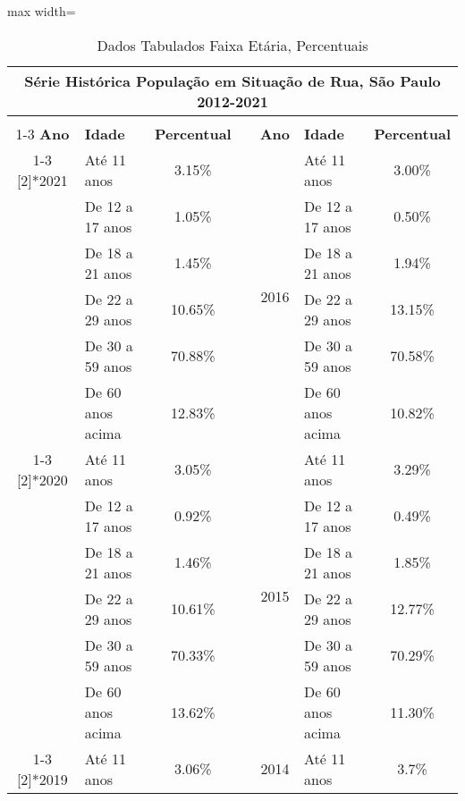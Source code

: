 \documentclass[14pt]{extarticle}
\begin{document}
\begin{table}[htbp]
  \centering
  \caption{Dados Tabulados Faixa Etária, Percentuais}
   \tabcolsep=0.15cm
	\renewcommand{\arraystretch}{1.0}
	\begin{adjustbox}{max width=\linewidth}
    \begin{tabular}{clcrclc}
    \toprule
    \multicolumn{7}{c}{Série Histórica População em Situação de Rua, São Paulo 2012-2021} \\
    \midrule
         &      &      &      &      &      &  \\
\cmidrule{1-3}\cmidrule{5-7}    \rowcolor[rgb]{ .906,  .902,  .902} \textbf{Ano} & \textbf{Idade} & \textbf{Percentual} & \cellcolor[rgb]{ .906,  .902,  .902} & \textbf{Ano} & \textbf{Idade} & \textbf{Percentual} \\
\cmidrule{1-3}\cmidrule{5-7}    \multirow{6}[2]{*}{2021} & Até 11 anos & 3.15\% &      & \multirow{6}[2]{*}{2016} & Até 11 anos & 3.00\% \\
         & De 12 a 17 anos & 1.05\% &      &      & De 12 a 17 anos & 0.50\% \\
         & De 18 a 21 anos & 1.45\% &      &      & De 18 a 21 anos & 1.94\% \\
         & De 22 a 29 anos & 10.65\% &      &      & De 22 a 29 anos & 13.15\% \\
         & De 30 a 59 anos & 70.88\% &      &      & De 30 a 59 anos & 70.58\% \\
         & De 60 anos acima & 12.83\% &      &      & De 60 anos acima & 10.82\% \\
\cmidrule{1-3}\cmidrule{5-7}    \multirow{6}[2]{*}{2020} & Até 11 anos & 3.05\% &      & \multirow{6}[2]{*}{2015} & Até 11 anos & 3.29\% \\
         & De 12 a 17 anos & 0.92\% &      &      & De 12 a 17 anos & 0.49\% \\
         & De 18 a 21 anos & 1.46\% &      &      & De 18 a 21 anos & 1.85\% \\
         & De 22 a 29 anos & 10.61\% &      &      & De 22 a 29 anos & 12.77\% \\
         & De 30 a 59 anos & 70.33\% &      &      & De 30 a 59 anos & 70.29\% \\
         & De 60 anos acima & 13.62\% &      &      & De 60 anos acima & 11.30\% \\
\cmidrule{1-3}\cmidrule{5-7}    \multirow{6}[2]{*}{2019} & Até 11 anos & 3.06\% &      & \multirow{6}[2]{*}{2014} & Até 11 anos & 3.7\% \\

\end{tabular}
\end{adjustbox}
\end{table}
\end{document}
